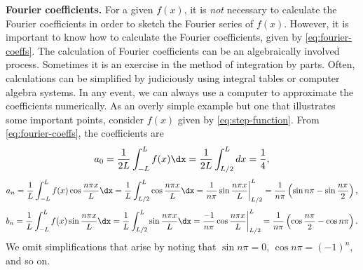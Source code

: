 \textbf{Fourier coefficients.}  For a given $f(x)$, it is \textit{not} necessary to calculate the Fourier coefficients in order to sketch the Fourier series of $f(x)$.  However, it is important to know how to calculate the Fourier coefficients, given by \eqref{eq:fourier-coeffs}.  The calculation of Fourier coefficients can be an algebraically involved process.  Sometimes it is an exercise in the method of integration by parts.  Often, calculations can be simplified by judiciously using integral tables or computer algebra systems.  In any event, we can always use a computer to approximate the coefficients numerically.  As an overly simple example but one that illustrates some important points, consider $f(x)$ given by \eqref{eq:step-function}.  From \eqref{eq:fourier-coeffs}, the coefficients are
\begin{equation}
\label{eq:a0-step}
a_0 = \frac{1}{2L} \int_{-L}^{L} f(x) \dx = \frac{1}{2L} \int_{L/2}^{L} dx = \frac{1}{4},
\end{equation}
\begin{equation}
\label{eq:an-step}
a_n = \frac{1}{L} \int_{-L}^{L} f(x) \cos \frac{n\pi x}{L} \dx = \frac{1}{L} \int_{L/2}^{L} \cos \frac{n\pi x}{L} \dx = \frac{1}{n\pi} \sin \frac{n\pi x}{L} \bigg|_{L/2}^{L}
= \frac{1}{n\pi} \left( \sin n\pi - \sin \frac{n\pi}{2} \right),
\end{equation}
\begin{equation}
\label{eq:bn-step}
b_n = \frac{1}{L} \int_{-L}^{L} f(x) \sin \frac{n\pi x}{L} \dx = \frac{1}{L} \int_{L/2}^{L} \sin \frac{n\pi x}{L} \dx = \frac{-1}{n\pi} \cos \frac{n\pi x}{L} \bigg|_{L/2}^{L}
= \frac{1}{n\pi} \left( \cos \frac{n\pi}{2} - \cos n\pi \right).
\end{equation}
We omit simplifications that arise by noting that $\sin n\pi = 0$, $\cos n\pi = (-1)^n$, and so on.

